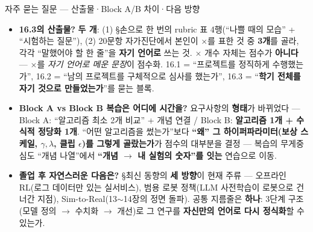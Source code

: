 \documentclass[aspectratio=169,11pt]{beamer}
\begin{document}
\begin{frame}{자주 묻는 질문 — 산출물·Block A/B 차이·다음 방향}
  \small
  \begin{itemize}
    \item \textbf{16.3의 산출물?} \textbf{두 개}: (1) §손으로
      한 번의 rubric 표 4행(``나쁠 때의 모습'' + ``시험하는
      질문''), (2) 20문항 자가진단에서 본인이 $\times$를 표한 것
      중 \textbf{3개}를 골라, 각각 ``말했어야 할 한 줄''을
      \textbf{자기 언어로} 쓰는 것. $\times$ 개수 자체는 점수가
      \textbf{아니다} — $\times$를 \emph{자기 언어로 메운 문장}이
      점수화. 16.1 = ``프로젝트를 정직하게 수행했는가'', 16.2 =
      ``남의 프로젝트를 구체적으로 심사를 했는가'', 16.3 = ``\textbf{학기
      전체를 자기 것으로 만들었는가}''를 묻는 블록.
    \item \textbf{Block A vs Block B 복습은 어디에 시간을?}
      요구사항의 \textbf{형태}가 바뀌었다 — Block A: ``알고리즘
      최소 2개 비교'' + 개념 연결 / Block B: \textbf{알고리즘 1개
      + 수식적 정당화 1개}. ``어떤 알고리즘을 썼는가''보다
      \textbf{``왜'' 그 하이퍼파라미터(보상 스케일, $\gamma,
      \lambda$, 클립 $\epsilon$)를 그렇게 골랐는가}가 점수의 대부분을
      결정 — 복습의 무게중심도 ``개념 나열''에서 \textbf{``개념
      $\to$ 내 실험의 숫자''를 잇는} 연습으로 이동.
    \item \textbf{졸업 후 자연스러운 다음은?} §최신 동향의
      \textbf{세 방향}이 현재 주류 — 오프라인 RL(로그 데이터만
      있는 실서비스), 범용 로봇 정책(LLM 사전학습이 로봇으로
      건너간 지점), Sim-to-Real(13$\sim$14장의 정면 돌파).
      공통 지름줄은 \textbf{하나}: 3단계 구조(모델 정의 $\to$
      수치화 $\to$ 개선)로 그 연구를 \textbf{자신만의 언어로
      다시 정식화}할 수 있는가.
  \end{itemize}
\end{frame}

\end{document}
